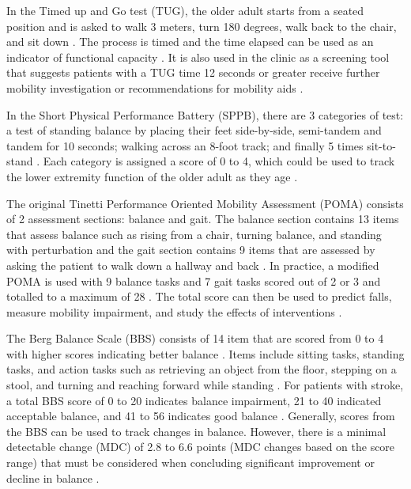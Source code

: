 In the Timed up and Go test (TUG), the older adult starts from a seated position and is asked 
to walk 3 meters, turn 180 degrees, walk back to the chair, and sit down \cite{podsiadlo_timed_1991}. The process is 
timed and the time elapsed can be used as an indicator of functional capacity \cite{podsiadlo_timed_1991}. It is also 
used in the clinic as a screening tool that suggests patients with a TUG time 12 seconds or 
greater \cite{bischoff_identifying_2003} receive further mobility investigation or recommendations for mobility aids \cite{avers_functional_2020}.

In the Short Physical Performance Battery (SPPB), there are 3 categories of test: a test of 
standing balance by placing their feet side-by-side, semi-tandem and tandem for 10 seconds; 
walking across an 8-foot track; and finally 5 times sit-to-stand \cite{guralnik_short_1994}. Each category is assigned 
a score of 0 to 4, which could be used to track the lower extremity function of the older adult as 
they age \cite{avers_functional_2020}. 

The original Tinetti Performance Oriented Mobility Assessment (POMA) consists of 2 assessment sections: 
balance and gait. The balance section contains 13 items that assess balance such as rising from a chair, 
turning balance, and standing with perturbation and the gait section contains 9 items that are assessed 
by asking the patient to walk down a hallway and back \cite{tinetti_performance-oriented_1986}. In practice, a modified POMA is used with 
9 balance tasks and 7 gait tasks scored out of 2 or 3 and totalled to a maximum of 28 \cite{soubra_systematic_2019}. The total 
score can then be used to predict falls, measure mobility impairment, and study the effects of 
interventions \cite{faber_clinimetric_2006}.  

The Berg Balance Scale (BBS) consists of 14 item that are scored from 0 to 4 with higher scores 
indicating better balance \cite{avers_functional_2020,ontario_chiropractic_association_berg_2022}. Items include sitting tasks, standing tasks, and action tasks 
such as retrieving an object from the floor, stepping on a stool, and turning and reaching forward 
while standing \cite{berg_measuring_1989}. For patients with stroke, a total BBS score of 0 to 20 indicates balance impairment, 
21 to 40 indicated acceptable balance, and 41 to 56 indicates good balance \cite{avers_functional_2020}. Generally, scores from the 
BBS can be used to track changes in balance. However, there is a minimal detectable change (MDC) of 2.8 
to 6.6 points (MDC changes based on the score range) that must be considered when concluding significant 
improvement or decline in balance \cite{avers_functional_2020}.

